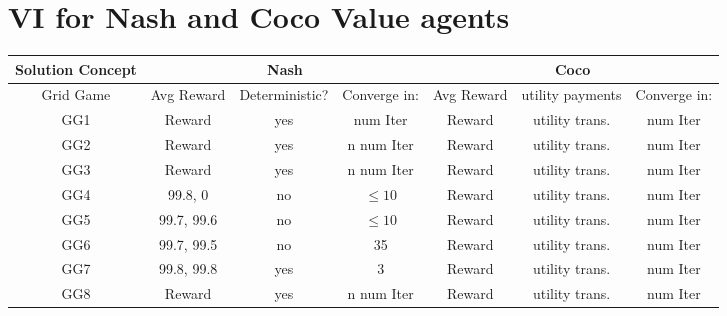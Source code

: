 \section{VI for Nash and Coco Value agents}
\begin{tabular}{||c||c|c||c|c||c|c||}
	\hline
	Solution Concept&  \multicolumn{3}{|c||}{Nash} &
	 \multicolumn{3}{|c||}{Coco}  \\ \hline
	Grid Game & Avg Reward & Deterministic?& Converge in: & Avg Reward & utility payments & Converge in: \\ \hline \hline
	GG1 & Reward & yes & num Iter & Reward & utility trans. & num Iter\\ \hline
	GG2 & Reward & yes & n num Iter & Reward & utility trans. & num Iter\\ \hline
	GG3 & Reward & yes & n num Iter & Reward & utility trans. & num Iter\\ \hline
	GG4 & 99.8, 0 & no & $\leq 10$ & Reward & utility trans. & num Iter\\ \hline
	GG5 & 99.7, 99.6 & no & $\leq 10$ & Reward & utility trans. & num Iter\\ \hline
	GG6 & 99.7, 99.5 & no & 35 & Reward & utility trans. & num Iter\\ \hline
	GG7 & 99.8, 99.8 & yes & 3 & Reward & utility trans. & num Iter\\ \hline
	GG8 & Reward & yes & n num Iter & Reward & utility trans. & num Iter\\ \hline
	
\end{tabular}

